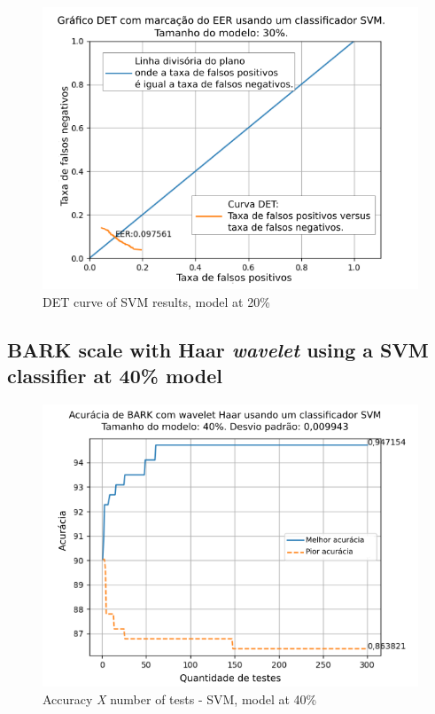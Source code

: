 \begin{figure}[h]
	\centering
	\includegraphics[width=\linewidth]{images/results/det/DET_SVM_30}
	\caption{DET curve of SVM results, model at 20\%}
	\label{fig:detsvm30}
\end{figure}

\subsection{BARK scale with Haar \textit{wavelet} using a SVM classifier at 40\% model}


\begin{figure}[ht]
	\centering
	\includegraphics[width=.95\linewidth]{images/results/confusionMatrices/classifier_SVM_40.png}
	\caption{Accuracy \textit{X} number of tests - SVM, model at 40\%}
	\label{fig:classifiersvm40}
\end{figure}


